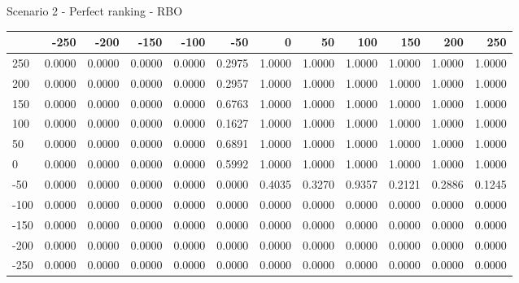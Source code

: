 Scenario 2 - Perfect ranking - RBO
\begin{tabular}{lrrrrrrrrrrr}
\toprule
{} &   -250 &   -200 &   -150 &   -100 &   -50  &    0   &    50  &    100 &    150 &    200 &    250 \\
\midrule
 250 & 0.0000 & 0.0000 & 0.0000 & 0.0000 & 0.2975 & 1.0000 & 1.0000 & 1.0000 & 1.0000 & 1.0000 & 1.0000 \\
 200 & 0.0000 & 0.0000 & 0.0000 & 0.0000 & 0.2957 & 1.0000 & 1.0000 & 1.0000 & 1.0000 & 1.0000 & 1.0000 \\
 150 & 0.0000 & 0.0000 & 0.0000 & 0.0000 & 0.6763 & 1.0000 & 1.0000 & 1.0000 & 1.0000 & 1.0000 & 1.0000 \\
 100 & 0.0000 & 0.0000 & 0.0000 & 0.0000 & 0.1627 & 1.0000 & 1.0000 & 1.0000 & 1.0000 & 1.0000 & 1.0000 \\
 50  & 0.0000 & 0.0000 & 0.0000 & 0.0000 & 0.6891 & 1.0000 & 1.0000 & 1.0000 & 1.0000 & 1.0000 & 1.0000 \\
 0   & 0.0000 & 0.0000 & 0.0000 & 0.0000 & 0.5992 & 1.0000 & 1.0000 & 1.0000 & 1.0000 & 1.0000 & 1.0000 \\
-50  & 0.0000 & 0.0000 & 0.0000 & 0.0000 & 0.0000 & 0.4035 & 0.3270 & 0.9357 & 0.2121 & 0.2886 & 0.1245 \\
-100 & 0.0000 & 0.0000 & 0.0000 & 0.0000 & 0.0000 & 0.0000 & 0.0000 & 0.0000 & 0.0000 & 0.0000 & 0.0000 \\
-150 & 0.0000 & 0.0000 & 0.0000 & 0.0000 & 0.0000 & 0.0000 & 0.0000 & 0.0000 & 0.0000 & 0.0000 & 0.0000 \\
-200 & 0.0000 & 0.0000 & 0.0000 & 0.0000 & 0.0000 & 0.0000 & 0.0000 & 0.0000 & 0.0000 & 0.0000 & 0.0000 \\
-250 & 0.0000 & 0.0000 & 0.0000 & 0.0000 & 0.0000 & 0.0000 & 0.0000 & 0.0000 & 0.0000 & 0.0000 & 0.0000 \\
\bottomrule
\end{tabular}

